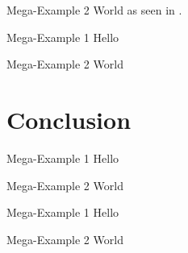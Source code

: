 \documentclass[aspectratio=169,usepdftitle=true]{beamer}
\begin{document}
\begin{frame}{Mega-Example 2}
    World as seen in \cite{pdf:ddc}.
\end{frame}


\begin{frame}{Mega-Example 1}
    Hello
\end{frame}

\begin{frame}{Mega-Example 2}
    World
\end{frame}


\section{Conclusion}

\begin{frame}{Mega-Example 1}
    Hello
\end{frame}

\begin{frame}{Mega-Example 2}
    World
\end{frame}


\begin{frame}{Mega-Example 1}
    Hello
\end{frame}

\begin{frame}{Mega-Example 2}
    World
\end{frame}
\end{document}
